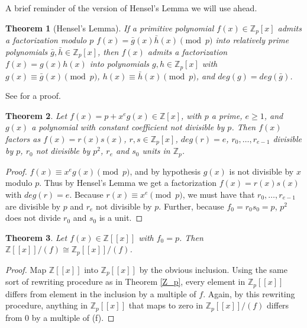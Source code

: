 \documentclass{article}
\newtheorem{theorem}{Theorem}
\begin{document}
A brief reminder of the version of Hensel's Lemma we will use ahead.

\begin{theorem}[Hensel's Lemma]
If a primitive polynomial $f(x) \in \mathbb{Z}_p[x]$ admits a factorization modulo $p$ $f(x) = \bar{g}(x)\bar{h}(x) \pmod{p}$ into relatively prime polynomials $\bar{g},\bar{h} \in \mathbb{Z}_p[x]$, then $f(x)$ admits a factorization $f(x) = g(x)h(x)$ into polynomials $g,h \in \mathbb{Z}_p[x]$ with $g(x) \equiv \bar{g}(x) \pmod{p}$, $h(x) \equiv \bar{h}(x) \pmod{p}$, and $deg(g) = deg(\bar{g})$.

\end{theorem}

See \cite{MR1697859} for a proof.

\begin{theorem} \label{factor}
Let $f(x) = p + x^e g(x) \in \mathbb{Z}[x]$, with $p$ a prime, $e \ge 1$, and $g(x)$ a polynomial with constant coefficient not divisible by $p$.  Then $f(x)$ factors as $f(x) = r(x)s(x)$, $r,s \in \mathbb{Z}_p[x]$, $deg(r) = e$, $r_0, \ldots, r_{e-1}$ divisible by $p$, $r_0$ not divisible by $p^2$, $r_e$ and $s_0$ units in $\mathbb{Z}_p$.
\end{theorem}

\begin{proof}
$f(x) \equiv x^e g(x) \pmod{p}$, and by hypothesis $g(x)$ is not divisible by $x$ modulo $p$.  Thus by Hensel's Lemma we get a factorization $f(x) = r(x)s(x)$ with $deg(r) = e$.  Because $r(x) \equiv x^e \pmod{p}$, we must have that $r_0, \ldots, r_{e-1}$ are divisible by $p$ and $r_e$ not divisible by $p$.  Further, because $f_0 = r_0 s_0 = p$, $p^2$ does not divide $r_0$ and $s_0$ is a unit.
\end{proof}

\begin{theorem}\label{expand}
Let $f(x) \in \mathbb{Z}[[x]]$ with $f_0 = p$.  Then $\mathbb{Z}[[x]]/(f) \cong \mathbb{Z}_p[[x]]/(f)$.
\end{theorem}

\begin{proof}
Map $\mathbb{Z}[[x]]$ into $\mathbb{Z}_p[[x]]$ by the obvious inclusion.  Using the same sort of rewriting procedure as in Theorem \ref{Z_p}, every element in $\mathbb{Z}_p[[x]]$ differs from element in the inclusion by a multiple of $f$.  Again, by this rewriting procedure, anything in $\mathbb{Z}_p[[x]]$ that maps to zero in $\mathbb{Z}_p[[x]]/(f)$ differs from 0 by a multiple of (f).
\end{proof}
\end{document}
